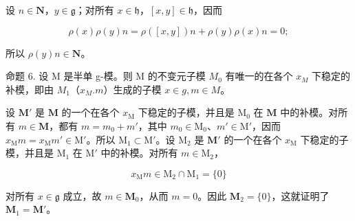 设 \(n\in \mathbf{N}\)，\(y\in \mathfrak{g}\)；对所有 \(x\in \mathfrak{h}\)，\([x,y]\in \mathfrak{h}\)，因而

\[
\rho (x) \rho (y) n = \rho ([ x, y ]) n + \rho (y) \rho (x) n = 0;
\]

所以 \(\rho(y)n\in\mathbf{N}\)。

命题 6. 设 M 是半单 g-模。则 M 的不变元子模 \(M_{0}\) 有唯一的在各个 \(x_{M}\) 下稳定的补模，即由 \(M_{1}\)（\(x_{M}.m\)）生成的子模 \(x \in g, m \in M\)。

设 \(\mathbf{M}'\) 是 \(\mathbf{M}\) 的一个在各个 \(x_{\mathrm{M}}\) 下稳定的子模，并且是 \(\mathrm{M}_0\) 在 \(\mathbf{M}\) 中的补模。对所有 \(m \in \mathbf{M}\)，都有 \(m = m_0 + m'\)，其中 \(m_0 \in \mathrm{M}_0\)、\(m' \in \mathrm{M}'\)，因而 \(x_{\mathrm{M}}m = x_{\mathrm{M}}m' \in \mathrm{M}'\)。所以 \(\mathrm{M}_1 \subset \mathrm{M}'\)。设 \(\mathrm{M}_2\) 是 \(\mathbf{M}'\) 的一个在各个 \(x_{\mathrm{M}}\) 下稳定的子模，并且是 \(\mathrm{M}_1\) 在 \(\mathrm{M}'\) 中的补模。对所有 \(m \in \mathrm{M}_2\)，

\[
x _ {\mathrm{M}} m \in \mathrm{M} _ {2} \cap \mathrm{M} _ {1} = \{0 \}
\]

对所有 \(x \in \mathfrak{g}\) 成立，故 \(m \in \mathbf{M}_0\)，从而 \(m = 0\)。因此 \(\mathbf{M}_2 = \{0\}\)，这就证明了 \(\mathbf{M}_1 = \mathbf{M}'\)。

